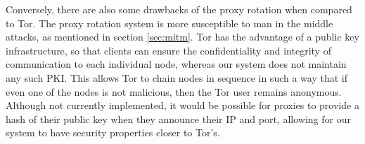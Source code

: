 Conversely, there are also some drawbacks of the proxy rotation when compared to Tor. The proxy rotation system is more susceptible to man in the middle attacks, as mentioned in section \ref{sec:mitm}. Tor has the advantage of a public key infrastructure, so that clients can ensure the confidentiality and integrity of communication to each individual node, whereas our system does not maintain any such PKI. This allows Tor to chain nodes in sequence in such a way that if even one of the nodes is not malicious, then the Tor user remains anonymous. Although not currently implemented, it would be possible for proxies to provide a hash of their public key when they announce their IP and port, allowing for our system to have security properties closer to Tor's.
